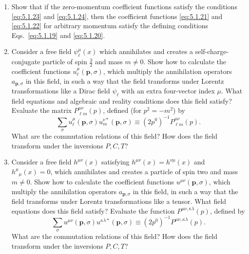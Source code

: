 

\begin{enumerate}
\item Show that if the zero-momentum coefficient functions satisfy the
conditions \eqref{eq:5.1.23} and \eqref{eq:5.1.24}, then the coefficient functions \eqref{eq:5.1.21}
and \eqref{eq:5.1.22} for arbitrary momentum satisfy the defining conditions
Eqs.~\eqref{eq:5.1.19} and \eqref{eq:5.1.20}.

\item Consider a free field $\psi_\ell^\mu(x)$ which annihilates and creates a
self-charge-conjugate particle of spin $\tfrac32$ and mass $m\ne0$. Show how
to calculate the coefficient functions $u_\ell^\mu(\mathbf p,\sigma)$, which
multiply the annihilation operators $a_{\mathbf p,\sigma}$ in this field, in
such a way that the field transforms under Lorentz transformations like a
Dirac field $\psi_\ell$ with an extra four-vector index $\mu$. What field
equations and algebraic and reality conditions does this field satisfy?
Evaluate the matrix $P_{\ell m}^{\mu\nu}(p)$, defined (for $p^2=-m^2$) by
\[
  \sum_\sigma u_\ell^\mu(\mathbf p,\sigma)
    u_m^{\nu *}(\mathbf p,\sigma)
  \equiv (2p^0)^{-1}P_{\ell m}^{\mu\nu}(p).
\]
What are the commutation relations of this field? How does the field
transform under the inversions $P,C,T$?

\item Consider a free field $h^{\mu\nu}(x)$ satisfying
$h^{\mu\nu}(x)=h^{\nu\mu}(x)$ and $h^\mu{}_\mu(x)=0$, which annihilates and
creates a particle of spin two and mass $m\ne0$. Show how to calculate the
coefficient functions $u^{\mu\nu}(\mathbf p,\sigma)$, which multiply the
annihilation operators $a_{\mathbf p,\sigma}$ in this field, in such a way that
the field transforms under Lorentz transformations like a tensor. What field
equations does this field satisfy? Evaluate the function
$P^{\mu\nu,\kappa\lambda}(p)$, defined by
\[
  \sum_\sigma u^{\mu\nu}(\mathbf p,\sigma)
    u^{\kappa\lambda *}(\mathbf p,\sigma)
  \equiv (2p^0)^{-1}P^{\mu\nu,\kappa\lambda}(p).
\]
What are the commutation relations of this field? How does the field
transform under the inversions $P,C,T$?


\end{enumerate}
